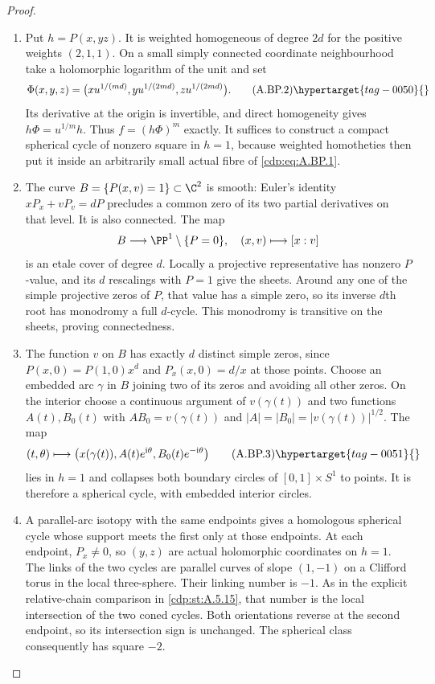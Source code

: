 \begin{proof}

\begin{enumerate}[label={$\langle1\rangle$\arabic*.},leftmargin=*]
\item Put $h=P(x,yz)$. It is weighted homogeneous of degree
$2d$ for the positive weights $(2,1,1)$.
On a small simply connected coordinate neighbourhood
take a holomorphic logarithm of the unit and set
\[
 \Phi(x,y,z)=\bigl(xu^{1/(md)},
                  yu^{1/(2md)},zu^{1/(2md)}\bigr).
                                                        \tag{A.BP.2}\hypertarget{tag-0050}{}\label{cdp:eq:A.BP.2}
\]
Its derivative at the origin is invertible, and direct
homogeneity gives $h\Phi=u^{1/m}h$. Thus
$f=(h\Phi)^m$ exactly. It suffices to construct a
compact spherical cycle of nonzero square in $h=1$,
because weighted homotheties then put it inside an
arbitrarily small actual fibre of \eqref{cdp:eq:A.BP.1}.

\item The curve $B=\{P(x,v)=1\}\subset\C^2$ is smooth:
Euler's identity $xP_x+vP_v=dP$ precludes a common
zero of its two partial derivatives on that level.
It is also connected. The map
\[
 B\longrightarrow\PP^1\setminus\{P=0\},
                       \quad(x,v)\longmapsto[x:v]
\]
is an etale cover of degree $d$. Locally a projective
representative has nonzero $P$-value, and its $d$
rescalings with $P=1$ give the sheets. Around any
one of the simple projective zeros of $P$, that
value has a simple zero, so its inverse $d$th root
has monodromy a full $d$-cycle. This monodromy is
transitive on the sheets, proving connectedness.

\item The function $v$ on $B$ has exactly $d$ distinct
simple zeros, since
$P(x,0)=P(1,0)x^d$ and $P_x(x,0)=d/x$ at those
points. Choose an embedded arc $\gamma$ in $B$
joining two of its zeros and avoiding all other
zeros. On the interior choose a continuous argument
of $v(\gamma(t))$ and two functions $A(t),B_0(t)$
with $A B_0=v(\gamma(t))$ and
$|A|=|B_0|=|v(\gamma(t))|^{1/2}$.
The map
\[
 (t,\theta)\longmapsto
   \bigl(x(\gamma(t)),A(t)e^{\mathrm i\theta},
                        B_0(t)e^{-\mathrm i\theta}\bigr)
                                                        \tag{A.BP.3}\hypertarget{tag-0051}{}\label{cdp:eq:A.BP.3}
\]
lies in $h=1$ and collapses both boundary circles
of $[0,1]\times S^1$ to points. It is therefore a
spherical cycle, with embedded interior circles.

\item A parallel-arc isotopy with the same endpoints gives
a homologous spherical cycle whose support meets
the first only at those endpoints. At each endpoint,
$P_x\ne0$, so $(y,z)$ are actual holomorphic
coordinates on $h=1$. The links of the two cycles
are parallel curves of slope $(1,-1)$ on a Clifford
torus in the local three-sphere. Their linking
number is $-1$. As in the explicit relative-chain
comparison in \ref{cdp:st:A.5.15}, that number is the local
intersection of the two coned cycles. Both
orientations reverse at the second endpoint,
so its intersection sign is unchanged. The
spherical class consequently has square $-2$.


\end{enumerate}
\end{proof}
